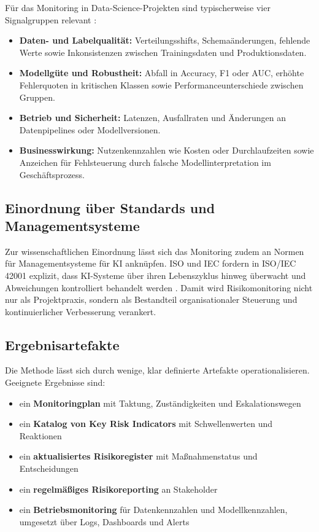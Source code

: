 Für das Monitoring in Data-Science-Projekten sind typischerweise vier Signalgruppen relevant \cite{Sculley2015,Amershi2019}:
\begin{itemize}
  \item \textbf{Daten- und Labelqualität:}
        Verteilungsshifts, Schemaänderungen, fehlende Werte sowie Inkonsistenzen
        zwischen Trainingsdaten und Produktionsdaten.
  \item \textbf{Modellgüte und Robustheit:}
        Abfall in Accuracy, F1 oder AUC, erhöhte Fehlerquoten in kritischen Klassen
        sowie Performanceunterschiede zwischen Gruppen.
  \item \textbf{Betrieb und Sicherheit:}
        Latenzen, Ausfallraten und Änderungen an Datenpipelines oder Modellversionen.
  \item \textbf{Businesswirkung:}
        Nutzenkennzahlen wie Kosten oder Durchlaufzeiten sowie Anzeichen für
        Fehlsteuerung durch falsche Modellinterpretation im Geschäftsprozess.
\end{itemize}

\subsection{Einordnung über Standards und Managementsysteme}
Zur wissenschaftlichen Einordnung lässt sich das Monitoring zudem an
Normen für Managementsysteme für KI anknüpfen.
ISO und IEC fordern in ISO/IEC 42001 explizit,
dass KI-Systeme über ihren Lebenszyklus hinweg überwacht
und Abweichungen kontrolliert behandelt werden \cite{ISOIEC42001_2023}.
Damit wird Risikomonitoring nicht nur als Projektpraxis,
sondern als Bestandteil organisationaler Steuerung und kontinuierlicher
Verbesserung verankert.

\subsection{Ergebnisartefakte}
Die Methode lässt sich durch wenige, klar definierte Artefakte operationalisieren.
Geeignete Ergebnisse sind:
\begin{itemize}
	\item ein \textbf{Monitoringplan} mit Taktung, Zuständigkeiten und Eskalationswegen
  \item ein \textbf{Katalog von Key Risk Indicators} mit Schwellenwerten und Reaktionen
  \item ein \textbf{aktualisiertes Risikoregister} mit Maßnahmenstatus und Entscheidungen
  \item ein \textbf{regelmäßiges Risikoreporting} an Stakeholder
  \item ein \textbf{Betriebsmonitoring} für Datenkennzahlen und Modellkennzahlen,
	umgesetzt über Logs, Dashboards und Alerts
	\cite{Amershi2019}
\end{itemize}
